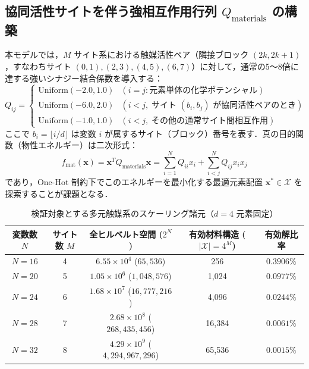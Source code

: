 \documentclass[11pt,a4paper]{ltjsarticle}
\begin{document}
\subsection{協同活性サイトを伴う強相互作用行列 \texorpdfstring{$Q_{\mathrm{materials}}$}{Q\_materials} の構築}
本モデルでは，$M$ サイト系における触媒活性ペア（隣接ブロック $(2k, 2k+1)$，すなわちサイト $(0,1), (2,3), (4,5), (6,7)$）に対して，通常の5〜8倍に達する強いシナジー結合係数を導入する：
\begin{equation}
Q_{ij} = \begin{cases}
\mathrm{Uniform}(-2.0, 1.0) & (i = j: \text{元素単体の化学ポテンシャル}) \\
\mathrm{Uniform}(-6.0, 2.0) & (i < j, \; \text{サイト } (b_i, b_j) \text{ が協同活性ペアのとき}) \\
\mathrm{Uniform}(-1.0, 1.0) & (i < j, \; \text{その他の通常サイト間相互作用})
\end{cases}
\end{equation}
ここで $b_i = \lfloor i / d \rfloor$ は変数 $i$ が属するサイト（ブロック）番号を表す．真の目的関数（物性エネルギー）は二次形式：
\begin{equation}
f_{\mathrm{mat}}(\bm{x}) = \bm{x}^T Q_{\mathrm{materials}} \bm{x} = \sum_{i=1}^N Q_{ii} x_i + \sum_{i < j}^N Q_{ij} x_i x_j
\end{equation}
であり，One-Hot 制約下でこのエネルギーを最小化する最適元素配置 $\bm{x}^* \in \mathcal{X}$ を探索することが課題となる．

\begin{table}[H]
\centering
\caption{検証対象とする多元触媒系のスケーリング諸元（$d=4$ 元素固定）}\label{tab:scale_dimensions}
\vspace{1mm}
\small
\begin{tabular}{ccccc}
\toprule
\textbf{変数数 $N$} & \textbf{サイト数 $M$} & \textbf{全ヒルベルト空間 ($2^N$)} & \textbf{有効材料構造 ($|\mathcal{X}| = 4^M$)} & \textbf{有効解比率} \\
\midrule
$N=16$ & 4 & $6.55 \times 10^4$ ($65,536$) & 256 & $0.3906\%$ \\
$N=20$ & 5 & $1.05 \times 10^6$ ($1,048,576$) & 1,024 & $0.0977\%$ \\
$N=24$ & 6 & $1.68 \times 10^7$ ($16,777,216$) & 4,096 & $0.0244\%$ \\
$N=28$ & 7 & $2.68 \times 10^8$ ($268,435,456$) & 16,384 & $0.0061\%$ \\
$N=32$ & 8 & $4.29 \times 10^9$ ($4,294,967,296$) & 65,536 & $0.0015\%$ \\
\bottomrule
\end{tabular}
\end{table}
\end{document}
